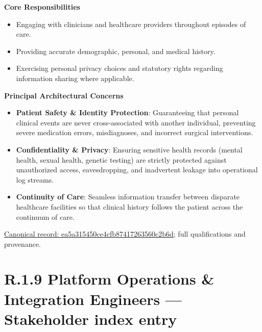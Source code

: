 \par\medskip\textbf{Core Responsibilities}\par


\begin{itemize}


\item Engaging with clinicians and healthcare providers throughout episodes of care.

\item Providing accurate demographic, personal, and medical history.

\item Exercising personal privacy choices and statutory rights regarding information sharing where applicable.

\end{itemize}


\par\medskip\textbf{Principal Architectural Concerns}\par


\begin{itemize}


\item \textbf{Patient Safety \& Identity Protection}: Guaranteeing that personal clinical events are never cross-associated with another individual, preventing severe medication errors, misdiagnoses, and incorrect surgical interventions.

\item \textbf{Confidentiality \& Privacy}: Ensuring sensitive health records (mental health, sexual health, genetic testing) are strictly protected against unauthorized access, eavesdropping, and inadvertent leakage into operational log streams.

\item \textbf{Continuity of Care}: Seamless information transfer between disparate healthcare facilities so that clinical history follows the patient across the continuum of care.

\end{itemize}

{\footnotesize \href{../../../../continuum/motivation/stakeholder/ea5a315450ce4cfb87417263560c2b6d.md}{Canonical record: ea5a315450ce4cfb87417263560c2b6d}; full qualifications and provenance.}\par
\section*{R.1.9 Platform Operations \& Integration Engineers — Stakeholder index entry}
\label{navigation:R.1.9}

